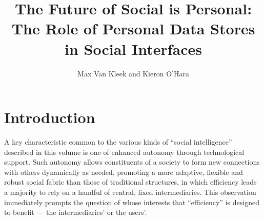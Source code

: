 \documentclass[graybox]{svmult}
\begin{document}
\title*{The Future of Social is Personal: The Role of Personal Data Stores in Social Interfaces}

\author{Max Van Kleek and Kieron O’Hara}

%
%
\maketitle

\section{Introduction}

A key characteristic common to the various kinds of ``social intelligence'' described in this volume is one of enhanced autonomy through technological support.  Such autonomy allows constituents of a society to form new connections with others dynamically as needed, promoting a more adaptive, flexible and robust social fabric than those of traditional structures, in which efficiency leads a majority to rely on a handful of central, fixed intermediaries. This observation immediately prompts the question of whose interests that ``efficiency'' is designed to benefit --- the intermediaries' or the users'.
\end{document}
